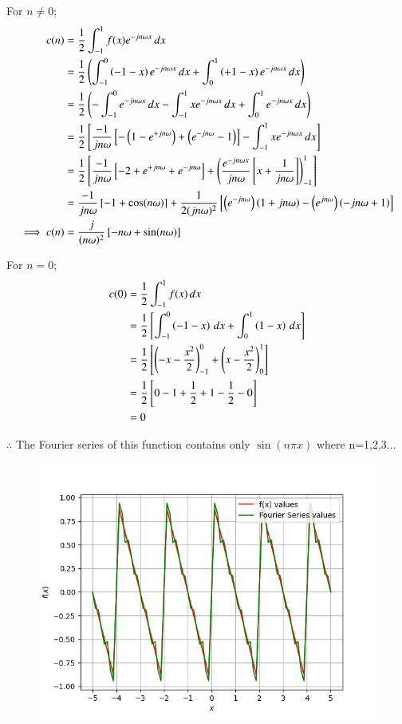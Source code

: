\documentclass[journal,12pt,onecolumn]{IEEEtran}
\theoremstyle{remark}
\begin{document}
For $n\neq 0$;
\begin{align}
c(n) &= \frac{1}{2} \int_{-1}^{1} f(x) e^{-jn\omega x} \, dx \\
&= \frac{1}{2} \left( \int_{-1}^{0}\left(-1-x\right)e^{-jn\omega x} \, dx +  \int_{0}^{1}\left(+1-x\right)e^{-jn\omega x} \, dx \right) \\
&= \frac{1}{2} \left(-\int_{-1}^{0}e^{-jn\omega x} \, dx-\int_{-1}^{1}xe^{-jn\omega x} \, dx + \int_{0}^{1}e^{-jn\omega x} \, dx\right) \\
&= \frac{1}{2} {}\left[\frac{-1}{jn\omega}{}\left[-\left(1 - e^{+jn\omega}\right) + \left(e^{-jn\omega} -1\right)\right] -\int_{-1}^{1}xe^{-jn\omega x} \, dx\right] \\
&= \frac{1}{2} {}\left[\frac{-1}{jn\omega}{}\left[-2 +e^{+jn\omega} + e^{-jn\omega}\right] +\left(\frac{e^{-jn\omega x}}{jn\omega}{}\left[x + \frac{1}{jn\omega}\right]\right)_{-1}^{1}\right] \\
&= \frac{-1}{jn\omega}{}\left[-1 + \cos(n\omega)\right] + \frac{1}{2(jn\omega)^2}{}\left[\left(e^{-jn\omega}  \right)\left(1+jn\omega\right)- \left(e^{jn\omega} \right)\left(-jn\omega+1\right)\right] \\
\implies c(n)&= \frac{j}{(n\omega)^2}{}\left[-n\omega +  \sin(n\omega)\right]
\end{align} 

For $n=0$;
\begin{align}
c(0) &= \frac{1}{2} \int_{-1}^{1} f(x) \, dx \\
&=  \frac{1}{2} {}\left[\int_{-1}^{0} \left(-1-x\right) \, dx + \int_{0}^{1} \left(1-x\right) \, dx \right] \\
&= \frac{1}{2} {}\left[ \left(-x-\frac{x^2}{2}\right)_{-1}^{0} + \left(x-\frac{x^2}{2}\right)_{0}^{1}\right] \\
&= \frac{1}{2} {}\left[0-1+\frac{1}{2} +1 -\frac{1}{2} -0\right] \\
&= 0
\end{align}


 $\therefore$ The Fourier series of this function contains only $\sin(n\pi x)$ where n=1,2,3...
 
 \begin{figure}[!ht]
    \centering
     \includegraphics[width=\columnwidth]{./figs/f.png}
    \caption{}    
    \label{fig:ishitha.g22.in.13.f1}
\end{figure}
 
\end{document}
